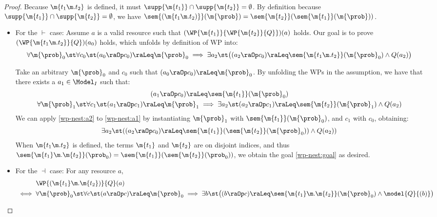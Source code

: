 \documentclass[acmsmall,nonacm,screen,appendix]{acmart}
\begin{document}
\begin{proof}
  Because $\m{t_1 \m. t_2}$ is defined,
  it must $\supp{\m{t_1}} \cap \supp{\m{t_2}} = \emptyset$.
  By definition
because $\supp{\m{t_1}} \cap \supp{\m{t_2}} = \emptyset$,
  we have
$
    \sem{(\m{t_1 \m. t_2)}}(\m{\prob})
    = \sem{\m{t_2}} (\sem{\m{t_1}} (\m{\prob}))
  $.


  \begin{itemize}
    \item For the $\vdash$ case:
Assume $a$ is a valid resource such that
  $(\WP {\m{t_1}} {\WP {\m{t_2}} {Q}})(a)$ holds.
  Our goal is to prove $(\WP {\m{t_1 \m. t_2}} {Q})(a_0)$ holds,
  which unfolds by definition of WP into:
  \begin{equation}
    \forall \m{\prob}_0\st
    \forall c_0 \st
    (a_0 \raOp c_0) \raLeq \m{\prob}_0
    \implies
      \exists a_2 \st
      \bigl(
        (a_2 \raOp c_0) \raLeq \sem{\m{t_1 \m. t_2}}(\m{\prob}_0)
      \land Q(a_2)
      \bigr)
    \label{wp-nest:goal}
  \end{equation}

  Take an arbitrary $\m{\prob}_0$ and $c_0$ such that
  $ (a_0 \raOp c_0) \raLeq \m{\prob}_0 $.
  By unfolding the WPs in the assumption,
  we have that there exists a
  $a_1 \in \Model_I$ such that:
  \begin{gather}
    (a_1 \raOp c_0) \raLeq \sem{\m{t_1}}(\m{\prob}_0)
    \label{wp-nest:a1}
    \\
    \forall \m{\prob}_1\st
    \forall c_1 \st
      (a_1 \raOp c_1) \raLeq \m{\prob}_1
      \implies
      \exists a_2 \st
      (a_2 \raOp c_1) \raLeq \sem{\m{t_2}}(\m{\prob}_1)
      \land  Q(a_2)
    \label{wp-nest:a2}
  \end{gather}
  We can apply \eqref{wp-nest:a2} to \eqref{wp-nest:a1}
  by instantiating $\m{\prob}_1$ with $\sem{\m{t_1}}(\m{\prob}_0)$,
  and $c_1$ with $c_0$,
  obtaining:
  \[
    \exists a_2 \st
    ((a_2 \raOp c_0) \raLeq \sem{\m{t_1}}(\sem{\m{t_2}}(\m{\prob}_0))
    \land  Q(a_2))
  \]
  When $\m{t_1 \m. t_2}$ is defined,
  the terms $\m{t_1}$ and $\m{t_2}$ are on disjoint indices,
  and thus
  $ \sem{ \m{t_1} \m. \m{t_2}}(\prob_0) = \sem{\m{t_1}}(\sem{\m{t_2}}(\prob_0)) $,
  we obtain the goal \eqref{wp-nest:goal} as desired.

    \item For the $\dashv$ case:
      For any resource $a$,
      \begin{align}
      &
      \WP {(\m{t_1} \m. \m{t_2})} {Q} (a) \notag \\
      {}\iff{} &
        \forall \m{\prob}_0 \st
        \forall c \st
        (a \raOp c) \raLeq \m{\prob}_0
        \implies
        \exists b \st
        \bigl(
          (b \raOp c) \raLeq \sem{\m{t_1} \m. \m{t_2}}(\m{\prob}_0)
          \land
          \model{Q}{(b)}
       \bigr)
       \label{helper:wp-nest:1}
      \end{align}


\end{itemize}
\end{proof}
\end{document}
